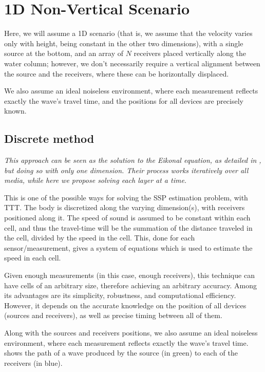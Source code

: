 \section{1D Non-Vertical Scenario}

Here, we will assume a 1D scenario (that is, we assume that the velocity varies only with height, being constant in the other two dimensions), with a single source at the bottom, and an array of $N$ receivers placed vertically along the water column; however, we don't necessarily require a vertical alignment between the source and the receivers, where these can be horizontally displaced.

We also assume an ideal noiseless environment, where each measurement reflects exactly the wave's travel time, and the positions for all devices are precisely known.

\subsection{Discrete method}
\label{subsec:sec3:discrete_method}

\textit{This approach can be seen as the solution to the Eikonal equation, as detailed in \cite{ali_opensource_2019}, but doing so with only one dimension. Their process works iteratively over all media, while here we propose solving each layer  at a time.}

This is one of the possible ways for solving the SSP estimation problem, with TTT. The body is discretized along the varying dimension(s), with receivers positioned along it. The speed of sound is assumed to be constant within each cell, and thus the travel-time will be the summation of the distance traveled in the cell, divided by the speed in the cell. This, done for each sensor/measurement, gives a system of equations which is used to estimate the speed in each cell.

Given enough measurements (in this case, enough receivers), this technique can have cells of an arbitrary size, therefore achieving an arbitrary accuracy. Among its advantages are its simplicity, robustness, and computational efficiency. However, it depends on the accurate knowledge on the position of all devices (sources and receivers), as well as precise timing between all of them.

Along with the sources and receivers positions, we also assume an ideal noiseless environment, where each measurement reflects exactly the wave's travel time.  shows the path of a wave produced by the source (in green) to each of the receivers (in blue).

